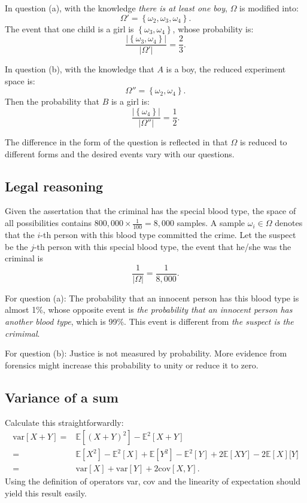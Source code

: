 \documentclass[UTF8]{ctexart}
\begin{document}
In question (a), with the knowledge \emph{there is at least one boy}, $\Omega$ is modified into:
$$\Omega'=\left\{\omega_{2},\omega_{3},\omega_{4} \right\}.$$ 
The event that one child is a girl is $\left\{\omega_{3},\omega_{4} \right\}$, whose probability is:
$$\frac{|\left\{\omega_{3},\omega_{4} \right\}|}{|\Omega'|}=\frac{2}{3}.$$

In question (b), with the knowledge that $A$ is a boy, the reduced experiment space is:
$$\Omega''=\left\{\omega_{2},\omega_{4} \right\}.$$
Then the probability that $B$ is a girl is:
$$\frac{|\left\{\omega_{4} \right\}|}{|\Omega''|}=\frac{1}{2}.$$

The difference in the form of the question is reflected in that $\Omega$ is reduced to different forms and the desired events vary with our questions. 

\subsection{Legal reasoning}
Given the assertation that the criminal has the special blood type, the space of all possibilities contains $800,000\times \frac{1}{100}=8,000$ samples.
A sample $\omega_{i}\in\Omega$ denotes that the $i$-th person with this blood type committed the crime. 
Let the suspect be the $j$-th person with this special blood type, the event that he/she was the criminal is
$$\frac{1}{|\Omega|}=\frac{1}{8,000}.$$

For question (a): The probability that an innocent person has this blood type is almost 1\%, whose opposite event is \emph{the probability that an innocent person has another blood type}, which is 99\%. 
This event is different from \emph{the suspect is the crimimal}.

For question (b): Justice is not measured by probability. 
More evidence from forensics might increase this probability to unity or reduce it to zero. 

\subsection{Variance of a sum}
Calculate this straightforwardly:
\begin{align}
\text{var}[X+Y]=&\mathbb{E}[(X+Y)^{2}]-\mathbb{E}^{2}[X+Y] \nonumber \\
=&\mathbb{E}[X^{2}]-\mathbb{E}^{2}[X]+\mathbb{E}[Y^{2}]-\mathbb{E}^{2}[Y]+2\mathbb{E}[XY]-2\mathbb{E}[X]\mathbb[Y] \nonumber \\
=&\text{var}[X]+\text{var}[Y]+2\text{cov}[X,Y].\nonumber
\end{align} 
Using the definition of operators var, cov and the linearity of expectation should yield this result easily. 
\end{document}
